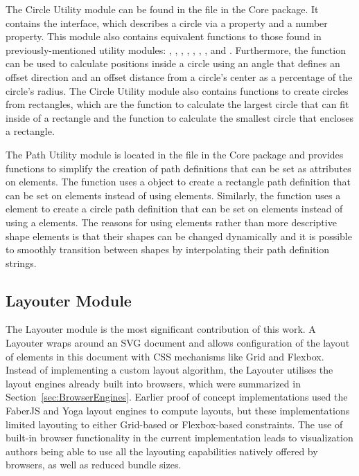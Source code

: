 The Circle Utility module can be found in the
 file in the Core package. It
contains the  interface, which describes a circle via a
  property and a  number
property. This module also contains equivalent functions to those
found in previously-mentioned utility modules: ,
, , ,
, , ,
and . Furthermore, the 
function can be used to calculate positions inside a circle using an
angle that defines an offset direction and an offset distance from a
circle's center as a percentage of the circle's radius. The
Circle Utility module also contains functions to create
circles from rectangles, which are the 
function to calculate the largest circle that can fit inside of a
rectangle and the  function to calculate the
smallest circle that encloses a rectangle.

The Path Utility module is located in the 
file in the Core package and provides functions to simplify the
creation of path definitions that can be set as  attributes on
 elements. The  function uses a
 object to create a rectangle path definition that can be
set on  elements instead of using  elements.
Similarly, the  function uses a  element
to create a circle path definition that can be set on 
elements instead of using a  elements. The reasons for
using  elements rather than more descriptive shape
elements is that their shapes can be changed dynamically and it
is possible to smoothly transition between shapes by interpolating
their path definition strings.





\subsection{Layouter Module}
\label{sec:Layouter}

The Layouter module is the most significant contribution of this
work. A Layouter wraps around an SVG document and allows configuration
of the layout of elements in this document with CSS mechanisms like
Grid and Flexbox. Instead of implementing a custom layout algorithm,
the Layouter utilises the layout engines already built into browsers,
which were summarized in Section~\ref{sec:BrowserEngines}. Earlier
proof of concept implementations used the FaberJS \parencite{FaberJS}
and Yoga \parencite{Yoga} layout engines to compute layouts, but these
implementations limited layouting to either Grid-based or
Flexbox-based constraints. The use of built-in browser functionality
in the current implementation leads to visualization authors being
able to use all the layouting capabilities natively offered by
browsers, as well as reduced bundle sizes.


